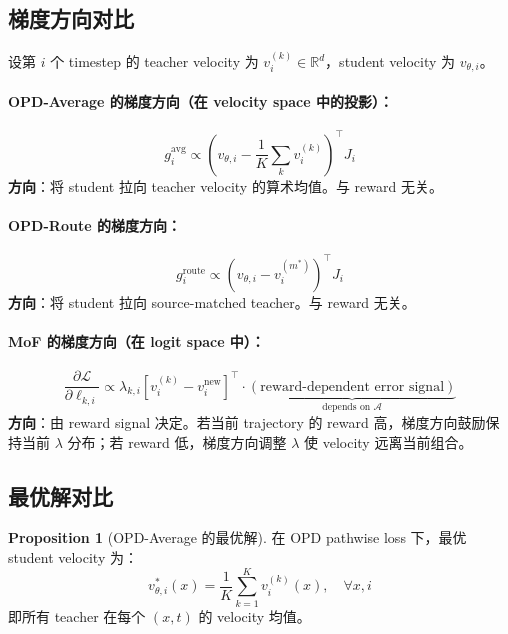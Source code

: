 \documentclass[11pt,a4paper]{article}
\newcommand{\loss}{\mathcal{L}}
\newcommand{\R}{\mathbb{R}}
\newcommand{\adv}{\mathcal{A}}
\theoremstyle{definition}
\newtheorem{proposition}{Proposition}
\begin{document}
\subsection{梯度方向对比}

设第 $i$ 个 timestep 的 teacher velocity 为 $v^{(k)}_i \in \R^d$，student velocity 为 $v_{\theta,i}$。

\paragraph{OPD-Average 的梯度方向（在 velocity space 中的投影）：}
\begin{equation}
g^{\mathrm{avg}}_i \propto \left(v_{\theta,i} - \frac{1}{K}\sum_k v^{(k)}_i\right)^\top J_i
\end{equation}
\textbf{方向}：将 student 拉向 teacher velocity 的算术均值。与 reward 无关。

\paragraph{OPD-Route 的梯度方向：}
\begin{equation}
g^{\mathrm{route}}_i \propto \left(v_{\theta,i} - v^{(m^*)}_i\right)^\top J_i
\end{equation}
\textbf{方向}：将 student 拉向 source-matched teacher。与 reward 无关。

\paragraph{MoF 的梯度方向（在 logit space 中）：}
\begin{equation}
\frac{\partial \loss}{\partial \ell_{k,i}} \propto \lambda_{k,i}\left[v^{(k)}_i - v^{\mathrm{new}}_i\right]^\top \cdot \underbrace{\left(\text{reward-dependent error signal}\right)}_{\text{depends on } \adv}
\end{equation}
\textbf{方向}：由 reward signal 决定。若当前 trajectory 的 reward 高，梯度方向鼓励保持当前 $\lambda$ 分布；若 reward 低，梯度方向调整 $\lambda$ 使 velocity 远离当前组合。

\subsection{最优解对比}

\begin{proposition}[OPD-Average 的最优解]
\label{prop:opd_avg_opt}
在 OPD pathwise loss 下，最优 student velocity 为：
\begin{equation}
v^*_{\theta,i}(x) = \frac{1}{K}\sum_{k=1}^K v^{(k)}_i(x), \quad \forall x, i
\end{equation}
即所有 teacher 在每个 $(x, t)$ 的 velocity 均值。
\end{proposition}
\end{document}
